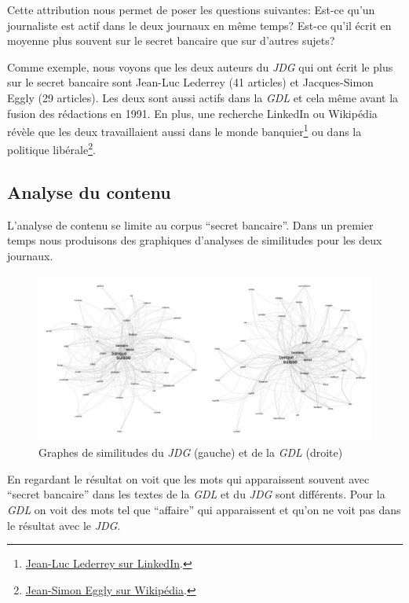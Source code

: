 \documentclass[11pt]{article}
\begin{document}
Cette attribution nous permet de poser les questions suivantes: Est-ce
qu'un journaliste est actif dans le deux journaux en même temps? Est-ce
qu'il écrit en moyenne plus souvent sur le secret bancaire que sur
d'autres sujets?

Comme exemple, nous voyons que les deux auteurs du \emph{JDG} qui ont
écrit le plus sur le secret bancaire sont Jean-Luc Lederrey (41
articles) et Jacques-Simon Eggly (29 articles). Les deux sont aussi
actifs dans la \emph{GDL} et cela même avant la fusion des rédactions en
1991. En plus, une recherche LinkedIn ou Wikipédia révèle que les deux
travaillaient aussi dans le monde banquier\footnote{\href{https://ch.linkedin.com/in/lederrey-jean-luc-1456b717}{Jean-Luc
  Lederrey sur LinkedIn}.} ou dans la politique libérale\footnote{\href{https://fr.wikipedia.org/wiki/Jacques-Simon_Eggly}{Jean-Simon
  Eggly sur Wikipédia}.}.

\hypertarget{analyse-du-contenu}{%
\subsection{Analyse du contenu}\label{analyse-du-contenu}}

L'analyse de contenu se limite au corpus ``secret bancaire''. Dans un
premier temps nous produisons des graphiques d'analyses de similitudes
pour les deux journaux.

\begin{figure}
\centering
\includegraphics[width=1\textwidth ]{methodology/similitude.png}
\caption{Graphes de similitudes du \emph{JDG} (gauche) et de la
\emph{GDL} (droite)}
\end{figure}

En regardant le résultat on voit que les mots qui apparaissent souvent
avec ``secret bancaire'' dans les textes de la \emph{GDL} et du
\emph{JDG} sont différents. Pour la \emph{GDL} on voit des mots tel que
``affaire'' qui apparaissent et qu'on ne voit pas dans le résultat avec
le \emph{JDG}.
\end{document}
